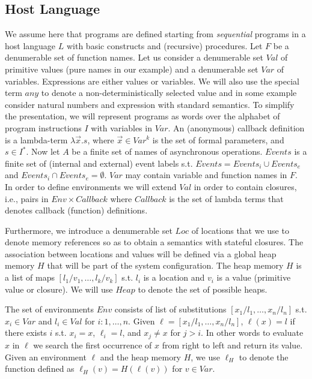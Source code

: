 \subsection{Host Language}
We assume here that programs are defined starting from {\em sequential} programs in a  host language $L$ with basic constructs and (recursive) procedures.  Let $F$ be a denumerable set of function names. 
Let us consider a denumerable set $Val$ of primitive values  (pure names in our example) and a 
denumerable set  $Var$ of variables. Expressions are either values or variables. We will also use the special term $any$ to denote a non-deterministically selected value and in some example consider natural numbers and expression with standard semantics.
To simplify the presentation, we will represent programs as words over the alphabet of program instructions $I$ with variables  in $Var$. 
An (anonymous) callback definition is a lambda-term $\lambda\vec{x}.s$, where $\vec{x}\in Var^k$ 
is the set of formal parameters, and $s\in I^*$. 
Now let $A$ be a finite set of names of asynchronous operations.
$Events$ is a finite set of (internal and external) event labels s.t. $Events=Events_i\cup Events_e$ and $Events_i\cap Events_e=\emptyset$.
$Var$ may contain variable and function names in $F$. 
In order to define environments we will extend $Val$ in order to contain closures, i.e., 
pairs in $Env\times Callback$ where $Callback$ is the set of lambda terms that denotes 
callback (function) definitions.

Furthermore, we introduce a denumerable set $Loc$ of locations that we use to denote 
memory references so as to obtain a semantics with stateful closures.
The association between locations and values will be defined via a global heap memory $H$ 
that will be part of the system configuration. 
The heap memory $H$ is a list of maps $[l_1/v_1,\ldots,l_k/v_k]$ s.t. $l_i$ is a location and 
$v_i$ is a value (primitive value or closure). 
We will use $Heap$ to denote the set of possible heaps.

The set of environments $Env$ consists of list of substitutions $[x_1/l_1,\ldots,x_n/l_n]$  s.t. $x_i\in Var$ and  $l_i\in Val$ for $i:1,\ldots,n$.
Given $\ell=[x_1/l_1,\ldots,x_n/l_n]$, $\ell(x)=l$ if there exists $i$ s.t. $x_i=x$, $\ell_i=l$, and $x_j\neq x$ for $j>i$.
In other words to evaluate $x$ in $\ell$ we search the first occurrence of $x$  from right to left and return its value.
Given an environment $\ell$ and the heap memory $H$, we use $\ell_H$ to denote the function 
defined as $\ell_H(v)=H(\ell(v))$ for $v\in Var$.


